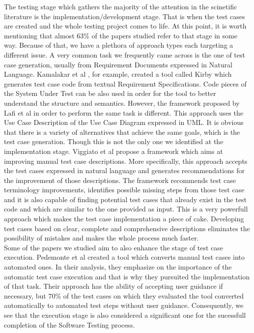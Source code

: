 The testing stage which gathers the majority of the attention in the scinetific literature is the implementation/development stage. That is when the test cases are created and the whole testing 
project comes to life. At this point, it is worth mentioning that almost 63\% of the papers studied refer to that stage in some way. Because of that, we have a plethora of approach types each 
targeting a different issue. A very common task we frequently came across is the one of test case generation, usually from Requirement Documents expressed in Natural Language. Kamalakar et al 
\cite{kamalakar2013automatically}, for example, created a tool called Kirby which generates test case code from textual Requirement Specifications. Code pieces of the System Under Test 
can be also used in order for the tool to better understand the structure and semantics. However, the framework proposed by Lafi et al \cite{9491761} in order to perform the same task is different. 
This approach uses the Use Case Description of the Use Case Diagram expressed in UML. It is obvious that there is a variety of alternatives that achieve the same goals, which is the test case generation. 
Though this is not the only one we identified at the implementation stage. Viggiato et al \cite{viggiato2022using} propose a framework which aims at improving manual test case descriptions. More specifically, 
this approach accepts the test cases expressed in natural language and generates recommendations for the improvement of those descriptions. The framework recommends test case terminology improvements, 
identifies possible missing steps from those test case and it is also capable of finding potential test cases that already exist in the test code and which are similar to the one provided as input. This 
is a very powerfull approach which makes the test case implementation a piece of cake. Developing test cases based on clear, complete and comprehensive descriptions eliminates the possibility of 
mistakes and makes the whole process much faster. \\

Some of the papers we studied aim to also enhance the stage of test case execution. Pedemonte et al \cite{pedemonte2012towards} created a tool which converts manual test cases into automated ones. 
In their analysis, they emphasize on the importance of the automatic test case execution and that is why they pursuited the implementation of that task. Their approach has the ability of accepting user 
guidance if necessary, but 70\% of the test cases on which they evaluated the tool converted automatically to automated test steps without user guidance. Consequently, we see that the execution stage is also 
considered a significant one for the sucessfull completion of the Software Testing process. \\

